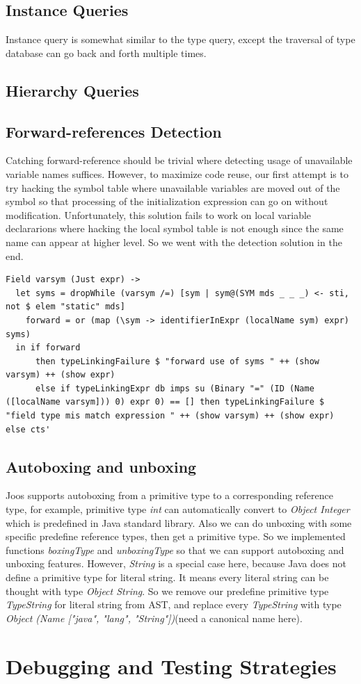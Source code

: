 \documentclass[12pt,letterpaper]{article}
\begin{document}
\subsection{Instance Queries}
Instance query is somewhat similar to the type query, except the traversal of type database can go back and forth multiple times.

\subsection{Hierarchy Queries}

\subsection{Forward-references Detection}
Catching forward-reference should be trivial where detecting usage of unavailable variable names suffices. However, to maximize code reuse, our first attempt is to try hacking the symbol table where unavailable variables are moved out of the symbol so that processing of the initialization expression can go on without modification. Unfortunately, this solution fails to work on local variable declararions where hacking the local symbol table is not enough since the same name can appear at higher level. So we went with the detection solution in the end.
\begin{lstlisting}
Field varsym (Just expr) ->
  let syms = dropWhile (varsym /=) [sym | sym@(SYM mds _ _ _) <- sti, not $ elem "static" mds]
    forward = or (map (\sym -> identifierInExpr (localName sym) expr) syms)
  in if forward
      then typeLinkingFailure $ "forward use of syms " ++ (show varsym) ++ (show expr)
      else if typeLinkingExpr db imps su (Binary "=" (ID (Name ([localName varsym])) 0) expr 0) == [] then typeLinkingFailure $ "field type mis match expression " ++ (show varsym) ++ (show expr) else cts'
\end{lstlisting}

\subsection{Autoboxing and unboxing}

Joos supports autoboxing from a primitive type to a corresponding reference type, for example, primitive type \emph{int} can automatically convert to \emph{Object Integer} which is predefined in Java standard library.
Also we can do unboxing with some specific predefine reference types, then get a primitive type.
So we implemented functions \emph{boxingType} and \emph{unboxingType} so that we can support autoboxing and unboxing features.
However, \emph{String} is a special case here, because Java does not define a primitive type for literal string.
It means every literal string can be thought with type \emph{Object String}.
So we remove our predefine primitive type \emph{TypeString} for literal string from AST, and replace every \emph{TypeString} with type \emph{Object (Name ["java", "lang", "String"])}(need a canonical name here).

\section{Debugging and Testing Strategies}
\end{document}
